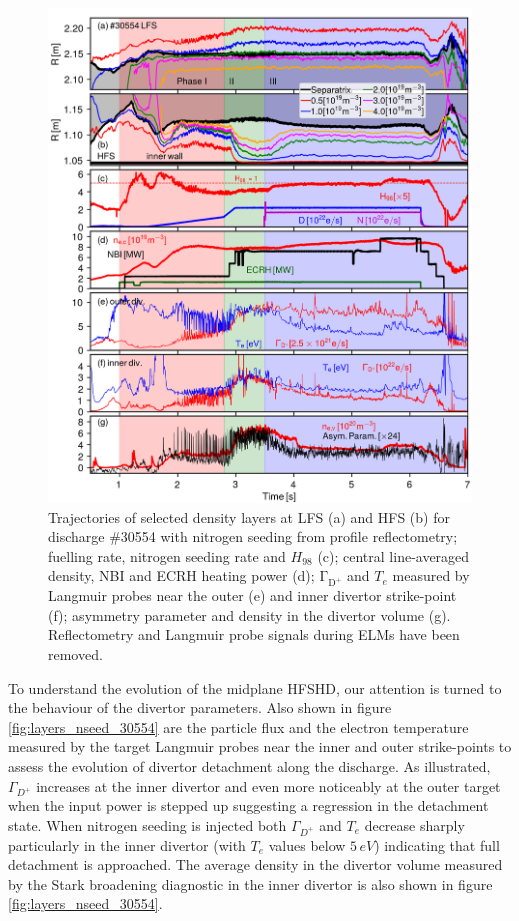 \documentclass[12pt]{iopart}
\begin{document}
\begin{figure}[!bt]
    \centering
    \includegraphics[]{Figure2.png}
    \caption[Overview of discharge \#30554.]{Trajectories of selected density layers at LFS (a) and HFS (b) for discharge \#30554 with nitrogen seeding from profile reflectometry; fuelling rate, nitrogen seeding rate and $H_{98}$ (c); central line-averaged density, NBI and ECRH heating power (d); $\mathrm{\Gamma_{D^{+}}}$ and $T_e$ measured by Langmuir probes near the outer (e) and inner divertor strike-point (f); asymmetry parameter and density in the divertor volume (g). Reflectometry and Langmuir probe signals during ELMs have been removed.}
    \label{fig:evo_30554}
\end{figure}

To understand the evolution of the midplane HFSHD, our attention is turned to the behaviour of the divertor parameters. Also shown in figure \ref{fig:layers_nseed_30554} are the particle flux and the electron temperature measured by the target Langmuir probes near the inner and outer strike-points to assess the evolution of divertor detachment along the discharge. As illustrated, $\Gamma_{D^{+}}$ increases at the inner divertor and even more noticeably at the outer target when the input power is stepped up suggesting a regression in the detachment state. When nitrogen seeding is injected both $\Gamma_{D^{+}}$ and $T_e$ decrease sharply particularly in the inner divertor (with $T_e$ values below $5\,eV$) indicating that full detachment is approached. The average density in the divertor volume measured by the Stark broadening diagnostic in the inner divertor is also shown in figure \ref{fig:layers_nseed_30554}.
\end{document}
